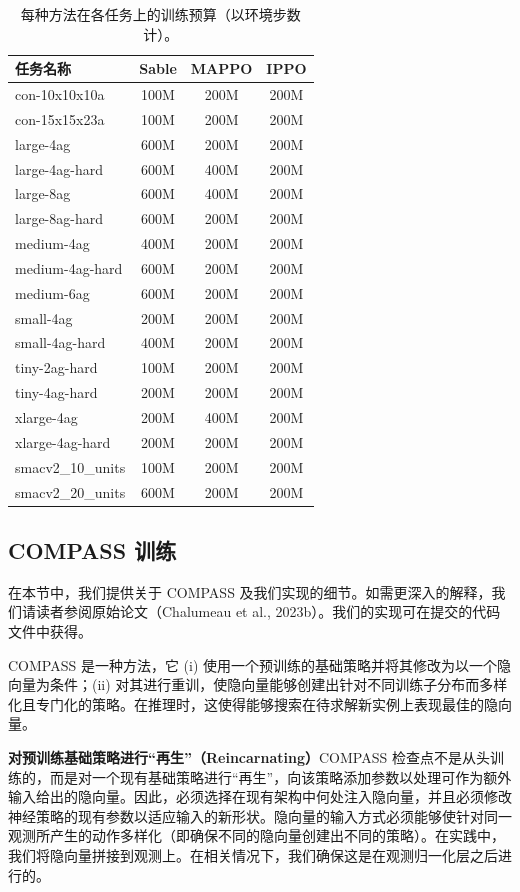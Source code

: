 \documentclass[11pt,UTF8,fontset=fandol]{ctexart}
\begin{document}
\begin{table}[H]\centering
\caption{每种方法在各任务上的训练预算（以环境步数计）。}
\label{tab:7}
\begin{tabular}{lccc}
\toprule
任务名称 & Sable & MAPPO & IPPO\\
\midrule
con-10x10x10a & 100M & 200M & 200M\\
con-15x15x23a & 100M & 200M & 200M\\
large-4ag & 600M & 200M & 200M\\
large-4ag-hard & 600M & 400M & 200M\\
large-8ag & 600M & 400M & 200M\\
large-8ag-hard & 600M & 200M & 200M\\
medium-4ag & 400M & 200M & 200M\\
medium-4ag-hard & 600M & 200M & 200M\\
medium-6ag & 600M & 200M & 200M\\
small-4ag & 200M & 200M & 200M\\
small-4ag-hard & 400M & 200M & 200M\\
tiny-2ag-hard & 100M & 200M & 200M\\
tiny-4ag-hard & 200M & 200M & 200M\\
xlarge-4ag & 200M & 400M & 200M\\
xlarge-4ag-hard & 200M & 200M & 200M\\
smacv2\_10\_units & 100M & 200M & 200M\\
smacv2\_20\_units & 600M & 200M & 200M\\
\bottomrule
\end{tabular}
\end{table}

\subsection{COMPASS 训练}

在本节中，我们提供关于 COMPASS 及我们实现的细节。如需更深入的解释，我们请读者参阅原始论文（Chalumeau et al., 2023b）。我们的实现可在提交的代码文件中获得。

COMPASS 是一种方法，它 (i) 使用一个预训练的基础策略并将其修改为以一个隐向量为条件；(ii) 对其进行重训，使隐向量能够创建出针对不同训练子分布而多样化且专门化的策略。在推理时，这使得能够搜索在待求解新实例上表现最佳的隐向量。

\textbf{对预训练基础策略进行“再生”（Reincarnating）}\quad COMPASS 检查点不是从头训练的，而是对一个现有基础策略进行“再生”，向该策略添加参数以处理可作为额外输入给出的隐向量。因此，必须选择在现有架构中何处注入隐向量，并且必须修改神经策略的现有参数以适应输入的新形状。隐向量的输入方式必须能够使针对同一观测所产生的动作多样化（即确保不同的隐向量创建出不同的策略）。在实践中，我们将隐向量拼接到观测上。在相关情况下，我们确保这是在观测归一化层之后进行的。
\end{document}
